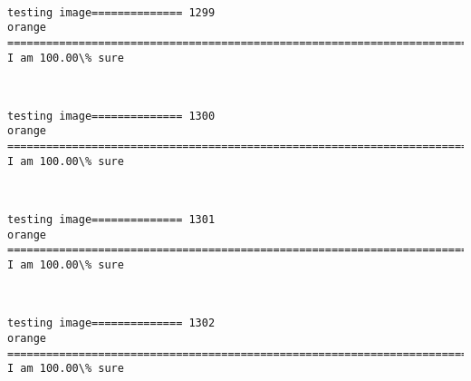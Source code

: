 \documentclass[11pt]{article}
\begin{document}
    \begin{center}
    \end{center}
    { \hspace*{\fill} \\}
    
    \begin{Verbatim}[commandchars=\\\{\}]
testing image============== 1299
orange
============================================================================
I am 100.00\% sure

    \end{Verbatim}

    \begin{center}
    \end{center}
    { \hspace*{\fill} \\}
    
    \begin{Verbatim}[commandchars=\\\{\}]
testing image============== 1300
orange
============================================================================
I am 100.00\% sure

    \end{Verbatim}

    \begin{center}
    \end{center}
    { \hspace*{\fill} \\}
    
    \begin{Verbatim}[commandchars=\\\{\}]
testing image============== 1301
orange
============================================================================
I am 100.00\% sure

    \end{Verbatim}

    \begin{center}
    \end{center}
    { \hspace*{\fill} \\}
    
    \begin{Verbatim}[commandchars=\\\{\}]
testing image============== 1302
orange
============================================================================
I am 100.00\% sure

    \end{Verbatim}
\end{document}
